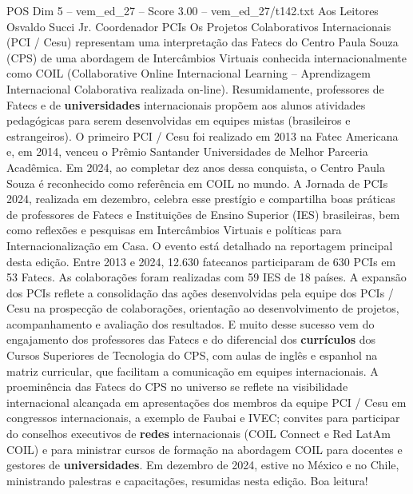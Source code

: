 \begin{textsample}{POS Dim 5 – vem\_ed\_27 – Score 3.00 – vem\_ed\_27/t142.txt}  \label{ex:f5_pos_037}
Aos Leitores Osvaldo Succi Jr.
Coordenador PCIs Os Projetos Colaborativos Internacionais (PCI / Cesu) representam uma interpretação das Fatecs do Centro Paula Souza (CPS) de uma abordagem de Intercâmbios Virtuais conhecida internacionalmente como COIL (Collaborative Online Internacional Learning – Aprendizagem Internacional Colaborativa realizada on-line).
Resumidamente, professores de Fatecs e de \textbf{universidades} internacionais propõem aos alunos atividades pedagógicas para serem desenvolvidas em equipes mistas (brasileiros e estrangeiros).
O primeiro PCI / Cesu foi realizado em 2013 na Fatec Americana e, em 2014, venceu o Prêmio Santander Universidades de Melhor Parceria Acadêmica.
Em 2024, ao completar dez anos dessa conquista, o Centro Paula Souza é reconhecido como referência em COIL no mundo.
A Jornada de PCIs 2024, realizada em dezembro, celebra esse prestígio e compartilha boas práticas de professores de Fatecs e Instituições de Ensino Superior (IES) brasileiras, bem como reflexões e pesquisas em Intercâmbios Virtuais e políticas para Internacionalização em Casa.
O evento está detalhado na reportagem principal desta edição.
Entre 2013 e 2024, 12.630 fatecanos participaram de 630 PCIs em 53 Fatecs.
As colaborações foram realizadas com 59 IES de 18 países.
A expansão dos PCIs reflete a consolidação das ações desenvolvidas pela equipe dos PCIs / Cesu na prospecção de colaborações, orientação ao desenvolvimento de projetos, acompanhamento e avaliação dos resultados.
E muito desse sucesso vem do engajamento dos professores das Fatecs e do diferencial dos \textbf{currículos} dos Cursos Superiores de Tecnologia do CPS, com aulas de inglês e espanhol na matriz curricular, que facilitam a comunicação em equipes internacionais.
A proeminência das Fatecs do CPS no universo se reflete na visibilidade internacional alcançada em apresentações dos membros da equipe PCI / Cesu em congressos internacionais, a exemplo de Faubai e IVEC; convites para participar do conselhos executivos de \textbf{redes} internacionais (COIL Connect e Red LatAm COIL) e para ministrar cursos de formação na abordagem COIL para docentes e gestores de \textbf{universidades}.
Em dezembro de 2024, estive no México e no Chile, ministrando palestras e capacitações, resumidas nesta edição.
Boa leitura!

\end{textsample}
